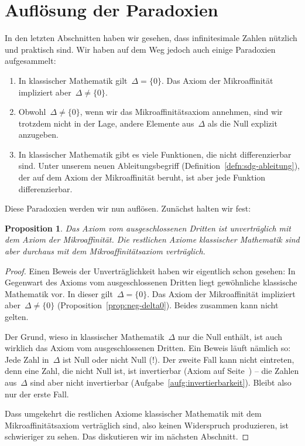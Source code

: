 \documentclass[twoside]{../zirkelblatt}
\theoremstyle{definition}
\theoremstyle{plain}
\newtheorem{prop}[defn]{Proposition}
\theoremstyle{remark}
\begin{document}
\section{Auflösung der Paradoxien}

In den letzten Abschnitten haben wir gesehen, dass infinitesimale Zahlen
nützlich und praktisch sind. Wir haben auf dem Weg jedoch auch einige
Paradoxien aufgesammelt:
\begin{enumerate}
\item[1.] In klassischer Mathematik gilt~$\Delta = \{0\}$. Das Axiom der
Mikroaffinität impliziert aber~$\Delta \neq \{0\}$.
\item[2.] Obwohl~$\Delta \neq \{0\}$, wenn wir das Mikroaffinitätsaxiom annehmen,
sind wir trotzdem nicht in der Lage, andere Elemente aus~$\Delta$ als die Null
explizit anzugeben.
\item[3.] In klassischer Mathematik gibt es viele Funktionen, die nicht
differenzierbar sind. Unter unserem neuen Ableitungsbegriff
(Definition~\ref{defn:sdg-ableitung}), der auf dem Axiom
der Mikroaffinität beruht, ist aber jede Funktion differenzierbar.
\end{enumerate}

Diese Paradoxien werden wir nun auflösen. Zunächst halten wir fest:

\begin{prop}Das Axiom vom ausgeschlossenen Dritten ist unverträglich mit dem
Axiom der Mikroaffinität. Die restlichen Axiome klassischer Mathematik
sind aber durchaus mit dem Mikroaffinitätsaxiom verträglich.\end{prop}
\begin{proof}Einen Beweis der Unverträglichkeit haben wir eigentlich schon
gesehen: In Gegenwart des Axioms vom ausgeschlossenen Dritten liegt gewöhnliche
klassische Mathematik vor. In dieser gilt~$\Delta = \{0\}$. Das Axiom der
Mikroaffinität impliziert aber~$\Delta \neq \{0\}$
(Proposition~\ref{prop:neg-delta0}). Beides zusammen kann nicht gelten.

Der Grund, wieso in klassischer Mathematik~$\Delta$ nur die Null enthält, ist
auch wirklich das Axiom vom ausgeschlossenen Dritten. Ein Beweis läuft nämlich
so: Jede Zahl in~$\Delta$ ist Null oder nicht Null (!). Der zweite Fall kann
nicht eintreten, denn eine Zahl, die nicht Null ist, ist invertierbar (Axiom
auf Seite~\pageref{ax:nichtnullinv}) -- die Zahlen aus~$\Delta$ sind aber nicht
invertierbar (Aufgabe~\ref{aufg:invertierbarkeit}). Bleibt also nur der erste
Fall.

Dass umgekehrt die restlichen Axiome klassischer Mathematik mit dem
Mikroaffinitätsaxiom verträglich sind, also keinen Widerspruch produzieren, ist
schwieriger zu sehen. Das diskutieren wir im nächsten Abschnitt.
\end{proof}
\end{document}
